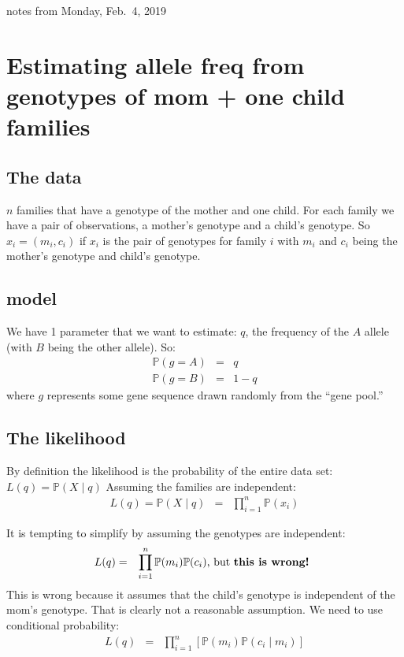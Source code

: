 \documentclass[11pt]{article}
\renewcommand{\Pr}{\mathbb{P}}
\begin{document}
notes from Monday, Feb.~4, 2019 \\
\tableofcontents

\section{Estimating allele freq from genotypes of mom + one child families}

\subsection{The data}
$n$ families that have a genotype of the mother and one child.
For each family we have a pair of observations, a mother's genotype and a child's genotype.
So $x_i = (m_i, c_i)$ if $x_i$ is the pair of genotypes
for family $i$ with  $m_i$ and $c_i$ being the mother's genotype and child's genotype.

\subsection{model}
We have 1 parameter that we want to estimate: $q$, the frequency of the $A$ allele (with $B$ being the other allele). So:
\begin{eqnarray}
  \Pr(g = A) & = & q \\
  \Pr(g = B) & = & 1- q
\end{eqnarray}
where $g$ represents some gene sequence drawn randomly from the ``gene pool.''

\subsection{The likelihood}
By definition the likelihood is the probability of the entire data set: $L(q) = \Pr(X\mid q)$
Assuming the families are independent:
\begin{eqnarray}
  L(q) = \Pr(X\mid q) & = & \prod_{i=1}^{n}\Pr(x_i) 
\end{eqnarray}

It is tempting to simplify by assuming the genotypes are independent:
\begin{eqnarray}\nonumber
  L(q) & = & \prod_{i=1}^{n}\Pr(m_i)\Pr(c_i) \mbox{, but \bf{this is wrong!} } 
\end{eqnarray}
This is wrong because it assumes that the child's genotype is independent of the mom's genotype. 
That is clearly not a reasonable assumption.
We need to use conditional probability:
\begin{eqnarray}
  L(q) & = & \prod_{i=1}^{n}\left[\Pr\left(m_i\right)\Pr\left(c_i\mid m_i\right)\right]
\end{eqnarray}
\end{document}
